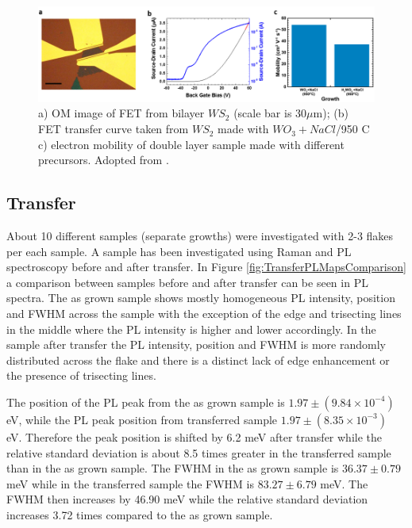 \begin{figure}[h]
	\begin{center}
		\includegraphics[scale=0.4]{PaperElectricalMeasurementBilayer.png}
		\caption{a) OM image of FET from bilayer $WS_2$ (scale bar is 30$\mu$m); (b) FET transfer curve taken from $WS_2$ made with $WO_3+NaCl$/950 {\degree}C c) electron mobility of double layer sample made with different precursors. Adopted from \cite{Reale2017}.}
		\label{fig:PaperElectricalMeasurementBilayer}
	\end{center}
\end{figure}
		
\subsection{Transfer}

About 10 different samples (separate growths) were investigated with 2-3 flakes per each sample. A sample has been investigated using Raman and PL spectroscopy before and after transfer. In Figure \ref{fig:TransferPLMapsComparison} a comparison between samples before and after transfer can be seen in PL spectra. The as grown sample shows mostly homogeneous PL intensity, position and FWHM across the sample with the exception of the edge and trisecting lines in the middle where the PL intensity is higher and lower accordingly. In the sample after transfer the PL intensity, position and FWHM is more randomly distributed across the flake and there is a distinct lack of edge enhancement or the presence of trisecting lines.
	
The position of the PL peak from the as grown sample is $1.97 \pm (9.84 \times 10^{-4})$ eV, while the PL peak position from transferred sample $1.97 \pm (8.35 \times 10^{-3})$ eV. Therefore the peak position is shifted by 6.2 meV after transfer while the relative standard deviation is about 8.5 times greater in the transferred sample than in the as grown sample. The FWHM in the as grown sample is $36.37 \pm 0.79$ meV while in the transferred sample the FWHM is $83.27 \pm 6.79$ meV. The FWHM then increases by 46.90 meV while the relative standard deviation increases 3.72 times compared to the as grown sample.

